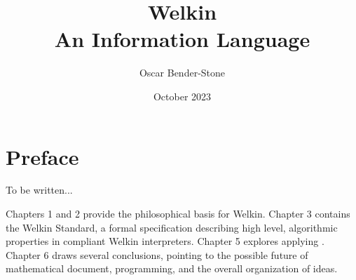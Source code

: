 \documentclass[leqno]{book}
\title{Welkin \\
  An Information Language}
\author{Oscar Bender-Stone}
\date{October 2023}
\theoremstyle{definition}
\begin{document}
\maketitle


\chapter*{Preface}

To be written...


Chapters 1 and 2 provide the philosophical basis for Welkin. Chapter 3 contains the Welkin Standard, a formal specification describing high level, algorithmic properties in compliant Welkin interpreters. Chapter 5 explores applying . Chapter 6 draws several conclusions, pointing to the possible future of mathematical document, programming, and the overall organization of ideas.


\mainmatter





\end{document}
